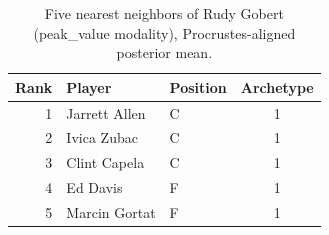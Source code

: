 \begin{table}[htbp]
  \centering\small
  \begin{tabular}{rllc}
    \toprule
    Rank & Player & Position & Archetype \\
    \midrule
    1 & Jarrett Allen & C & 1 \\
    2 & Ivica Zubac & C & 1 \\
    3 & Clint Capela & C & 1 \\
    4 & Ed Davis & F & 1 \\
    5 & Marcin Gortat & F & 1 \\
    \bottomrule
  \end{tabular}
  \caption{Five nearest neighbors of Rudy Gobert (peak_value modality), Procrustes-aligned posterior mean.}
  \label{tab:Rudy_Gobert_neighbors_peak_value}
\end{table}

